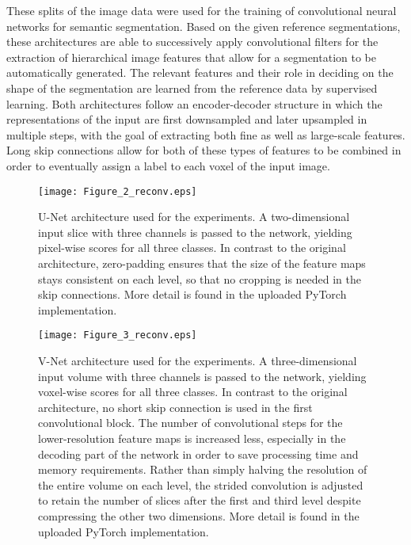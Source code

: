 \documentclass[10pt,letterpaper]{article}
\begin{document}
	These splits of the image data were used for the training of convolutional neural networks for semantic segmentation. Based on the given reference segmentations, these architectures are able to successively apply convolutional filters for the extraction of hierarchical image features that allow for a segmentation to be automatically generated. The relevant features and their role in deciding on the shape of the segmentation are learned from the reference data by supervised learning.
	Both architectures follow an encoder-decoder structure in which the representations of the input are first downsampled and later upsampled in multiple steps, with the goal of extracting both fine as well as large-scale features. Long skip connections allow for both of these types of features to be combined in order to eventually assign a label to each voxel of the input image.

		\begin{figure}[t] %


			\texttt{[image: Figure\_2\_reconv.eps]}

			\caption{U-Net architecture used for the experiments. A two-dimensional input slice with three channels is passed to the network, yielding pixel-wise scores for all three classes. In contrast to the original architecture, zero-padding ensures that the size of the feature maps stays consistent on each level, so that no cropping is needed in the skip connections. More detail is found in the uploaded PyTorch implementation.}

			\label{fig2} %

		\end{figure}

			\begin{figure}[t] %


				\texttt{[image: Figure\_3\_reconv.eps]}

				\caption{V-Net architecture used for the experiments. A three-dimensional input volume with three channels is passed to the network, yielding voxel-wise scores for all three classes. In contrast to the original architecture, no short skip connection is used in the first convolutional block. The number of convolutional steps for the lower-resolution feature maps is increased less, especially in the decoding part of the network in order to save processing time and memory requirements. Rather than simply halving the resolution of the entire volume on each level, the strided convolution is adjusted to retain the number of slices after the first and third level despite compressing the other two dimensions. More detail is found in the uploaded PyTorch implementation.}

				\label{fig3} %

			\end{figure}
\end{document}
